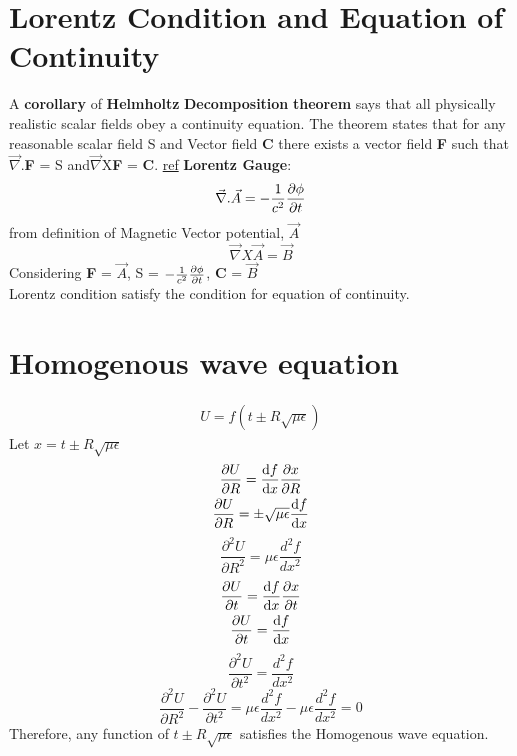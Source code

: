 \documentclass[11pt, a4paper]{article}
\begin{document}
\section{Lorentz Condition and Equation of Continuity}
A \textbf{corollary}  of \textbf{Helmholtz} \textbf{Decomposition} \textbf{theorem} says that all physically realistic scalar fields obey a continuity equation. The theorem states that for any reasonable scalar field S and Vector field \textbf{C}  there exists a vector field \textbf{F} such that \(\vec{\nabla}\).\textbf{F} = S and\(\vec{\nabla}\)X\textbf{F} = \textbf{C}. \href{http://dfcd.net/articles/potentialfields.pdf}{ref}\newline
\textbf{Lorentz Gauge}: 
\begin{gather}
    \vec{\nabla}.\vec{A} = -\frac{1}{c^2}\pdv{\phi}{t}
\end{gather}
from definition  of Magnetic Vector potential, \(\vec{A}\)
\begin{equation}
    \vec{\nabla}X\vec{A} = \vec{B}
\end{equation}
Considering \textbf{F} = $\vec{A}$, S = $-\frac{1}{c^2}\pdv{\phi}{t}$, \textbf{C} = \(\vec{B}\) \\
Lorentz condition satisfy the condition for equation of continuity. 
\section{Homogenous wave equation}
\begin{gather}
    U = f(t \pm R\sqrt{\mu \epsilon } )
\end{gather}
Let \(x = t \pm R\sqrt{\mu \epsilon }\)
\begin{gather}
    \pdv{U}{R} = \odv{f}{x} \pdv{x}{R}\\
    \pdv{U}{R} = \pm\sqrt{\mu \epsilon} \odv{f}{x}
\end{gather}
\begin{equation}
    \boxed{\frac{\partial ^2 U}{\partial R^2} = \mu \epsilon \frac{d^{2}f }{dx^2}}
\end{equation}
\begin{gather}
    \pdv{U}{t} = \odv{f}{x} \pdv{x}{t}\\
    \pdv{U}{t} = \odv{f}{x}
\end{gather}
\begin{equation}
    \boxed{\frac{\partial ^2 U}{\partial t^2} = \frac{d^{2}f }{dx^2}}
\end{equation}
\begin{equation}
    \boxed{\frac{\partial ^2 U}{\partial R^2} -\frac{\partial ^2 U}{\partial t^2} = \mu \epsilon \frac{d^{2}f }{dx^2} - \mu \epsilon \frac{d^2 f}{dx^2} = 0}
\end{equation}
Therefore, any function of $t\pm R \sqrt{\mu \epsilon}$ satisfies the Homogenous wave equation.  
\end{document}
